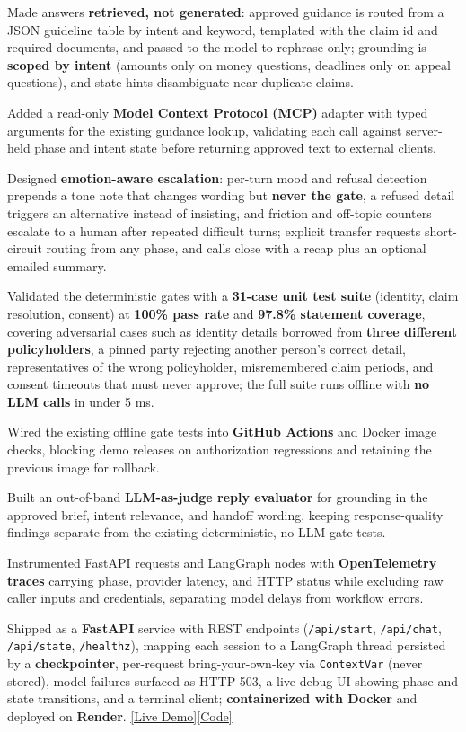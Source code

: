 \documentclass[letterpaper,11pt]{article}
\newcommand{\resumeItem}[1]{
  \item\small{
    {#1 \vspace{-2pt}}
  }
}
\begin{document}
        \resumeItem{Made answers \textbf{retrieved, not generated}: approved guidance is routed from a JSON guideline table by intent and keyword, templated with the claim id and required documents, and passed to the model to rephrase only; grounding is \textbf{scoped by intent} (amounts only on money questions, deadlines only on appeal questions), and state hints disambiguate near-duplicate claims.}
        \resumeItem{Added a read-only \textbf{Model Context Protocol (MCP)} adapter with typed arguments for the existing guidance lookup, validating each call against server-held phase and intent state before returning approved text to external clients.}
        \resumeItem{Designed \textbf{emotion-aware escalation}: per-turn mood and refusal detection prepends a tone note that changes wording but \textbf{never the gate}, a refused detail triggers an alternative instead of insisting, and friction and off-topic counters escalate to a human after repeated difficult turns; explicit transfer requests short-circuit routing from any phase, and calls close with a recap plus an optional emailed summary.}
        \resumeItem{Validated the deterministic gates with a \textbf{31-case unit test suite} (identity, claim resolution, consent) at \textbf{100\% pass rate} and \textbf{97.8\% statement coverage}, covering adversarial cases such as identity details borrowed from \textbf{three different policyholders}, a pinned party rejecting another person's correct detail, representatives of the wrong policyholder, misremembered claim periods, and consent timeouts that must never approve; the full suite runs offline with \textbf{no LLM calls} in under 5 ms.}
        \resumeItem{Wired the existing offline gate tests into \textbf{GitHub Actions} and Docker image checks, blocking demo releases on authorization regressions and retaining the previous image for rollback.}
        \resumeItem{Built an out-of-band \textbf{LLM-as-judge reply evaluator} for grounding in the approved brief, intent relevance, and handoff wording, keeping response-quality findings separate from the existing deterministic, no-LLM gate tests.}
        \resumeItem{Instrumented FastAPI requests and LangGraph nodes with \textbf{OpenTelemetry traces} carrying phase, provider latency, and HTTP status while excluding raw caller inputs and credentials, separating model delays from workflow errors.}
        \resumeItem{Shipped as a \textbf{FastAPI} service with REST endpoints (\texttt{/api/start}, \texttt{/api/chat}, \texttt{/api/state}, \texttt{/healthz}), mapping each session to a LangGraph thread persisted by a \textbf{checkpointer}, per-request bring-your-own-key via \texttt{ContextVar} (never stored), model failures surfaced as HTTP 503, a live debug UI showing phase and state transitions, and a terminal client; \textbf{containerized with Docker} and deployed on \textbf{Render}. \href{https://sop-guided-agent.onrender.com/}{[Live Demo]}\href{https://github.com/Elaakarsh31/SOP-Guided-Agent}{[Code]}}
\end{document}
